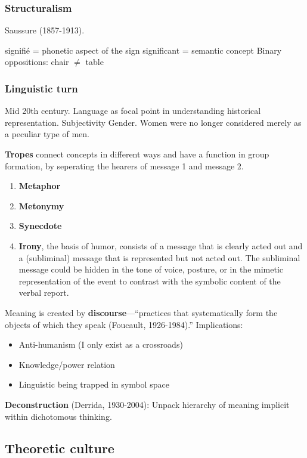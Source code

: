 \documentclass{article}
\begin{document}
\subsubsection{Structuralism}

Saussure (1857-1913).

signifi\'{e} = phonetic aspect of the sign
significant = semantic concept
Binary oppositions: chair $\ne$ table

\subsubsection{Linguistic turn}

Mid 20th century.
Language as focal point  in understanding historical representation.
Subjectivity
Gender. Women were no longer considered merely as a peculiar type of men.

\textbf{Tropes} connect concepts in different ways and have a function in group formation, by seperating the hearers of message 1 and message 2.

\begin{enumerate}
  \item \textbf{Metaphor}
  \item \textbf{Metonymy}
  \item \textbf{Synecdote}
  \item \textbf{Irony}, the basis of humor, consists of a message that is clearly acted out and a (subliminal) message that is represented but not acted out. The subliminal message could be hidden in the tone of voice, posture, or in the mimetic representation of the event to contrast with the symbolic content of the verbal report.
\end{enumerate}

Meaning is created by \textbf{discourse}---“practices that systematically form the objects of which they speak (Foucault, 1926-1984).” Implications:
\begin{itemize}
  \item Anti-humanism (I only exist as a crossroads)
  \item Knowledge/power relation
  \item Linguistic being trapped in symbol space
\end{itemize}

\textbf{Deconstruction} (Derrida, 1930-2004): Unpack hierarchy of meaning implicit within dichotomous thinking.

\subsection{Theoretic culture}
\end{document}

